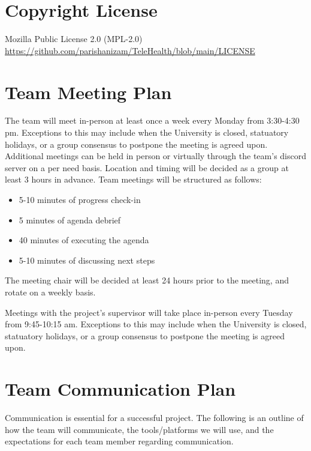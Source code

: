 \documentclass{article}
\begin{document}
\section{Copyright License}

Mozilla Public License 2.0 (MPL-2.0) \\
\url{https://github.com/parishanizam/TeleHealth/blob/main/LICENSE}

\section{Team Meeting Plan}

The team will meet in-person at least once a week every Monday from 3:30-4:30 pm. Exceptions to this 
may include when the University is closed, statuatory holidays, or a group consensus to postpone the meeting
is agreed upon. Additional meetings can be held in person or virtually through the team's discord server on 
a per need basis. Location and timing will be decided as a group at least 3 hours in advance. Team meetings will
be structured as follows:
\begin{itemize}
  \item 5-10 minutes of progress check-in 
  \item 5 minutes of agenda debrief
  \item 40 minutes of executing the agenda
  \item 5-10 minutes of discussing next steps
\end{itemize}
The meeting chair will be decided at least 24 hours prior to the meeting, and rotate on a weekly basis.

Meetings with the project's supervisor will take place in-person every Tuesday from 9:45-10:15 am. Exceptions 
to this may include when the University is closed, statuatory holidays, or a group consensus to postpone the 
meeting is agreed upon.

\section{Team Communication Plan}

Communication is essential for a successful project. The following is an outline of how the team will 
communicate, the tools/platforms we will use, and the expectations for each team member regarding communication.
\end{document}
